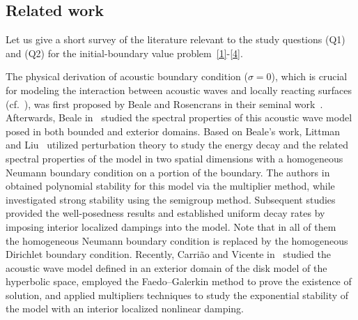 \documentclass[10pt]{elsarticle}
\begin{document}
\subsection{Related work} 
Let us give a short survey of the literature relevant to the study questions (Q1) and (Q2) for the initial-boundary value problem~\eqref{1}-\eqref{4}.

The physical derivation of acoustic boundary condition ($\sigma = 0$), which is crucial for modeling the interaction between acoustic waves and locally reacting surfaces (cf.~\cite[pp. 259-264]{MI}), was first proposed by Beale and Rosencrans in their seminal work~\cite{BR}. Afterwards, Beale in~\cite{B1,B2} studied the spectral properties of this acoustic wave model posed in both bounded and exterior domains. Based on Beale's work, Littman and Liu~\cite{LL} utilized perturbation theory to study the energy decay and the related
spectral properties of the model in two spatial dimensions with a homogeneous Neumann boundary condition on a portion of the boundary. 
The authors in~\cite{rivera2003polynomial,AN2} obtained polynomial stability for this model via the multiplier method, while~\cite{AN1} investigated strong stability using the semigroup method. Subsequent studies~\cite{Gao2,cavalcanti2020stability,li2025dynamic} provided the well-posedness results and established uniform decay rates by imposing interior localized dampings into the model. Note that in all of them~\cite{rivera2003polynomial,AN2,AN1,Gao2,cavalcanti2020stability,li2025dynamic} the homogeneous Neumann boundary condition is replaced by the homogeneous Dirichlet boundary condition.
Recently, Carri\~ao and Vicente in~\cite{carriao2025stability} studied the acoustic wave model defined in an exterior domain of the disk model of the hyperbolic space, employed the Faedo--Galerkin method to prove the existence of solution, and applied multipliers techniques to study the exponential stability of the model with an interior localized nonlinear damping. 
\end{document}
